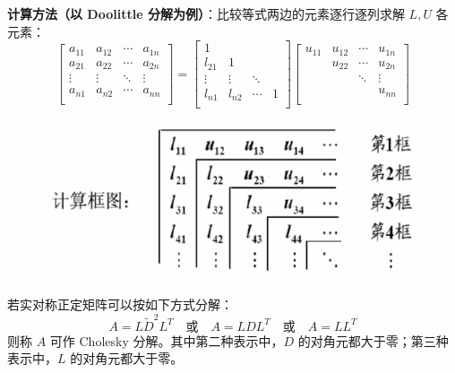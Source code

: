 \noindent\textbf{计算方法（以 Doolittle 分解为例）}：比较等式两边的元素逐行逐列求解 $L,U$ 各元素：
\[
    \begin{bmatrix}
    a_{11}&a_{12}&\cdots&a_{1n}\\
    a_{21}&a_{22}&\cdots&a_{2n}\\
    \vdots&\vdots&\ddots&\vdots\\
    a_{n1}&a_{n2}&\cdots&a_{nn}\\
    \end{bmatrix}=
    \begin{bmatrix}
    1&&&\\
    l_{21}&1&&\\
    \vdots&\vdots&\ddots&\\
    l_{n1}&l_{n2}&\cdots&1\\
    \end{bmatrix}
    \begin{bmatrix}
    u_{11}&u_{12}&\cdots&u_{1n}\\
    &u_{22}&\cdots&u_{2n}\\
    &&\ddots&\vdots\\
    &&&u_{nn}\\
    \end{bmatrix}
\]
\begin{figure}[H]
    \centering
    \includegraphics[width=0.5\linewidth]{figs/calc.png}
\end{figure}

\begin{definition}[Cholesky 分解]
若实对称正定矩阵可以按如下方式分解：
\[
    A=L\tilde D^2L^T\quad\text{或}\quad A=LDL^T\quad\text{或}\quad A=LL^T
\]
则称 $A$ 可作 Cholesky 分解。其中第二种表示中，$D$ 的对角元都大于零；第三种表示中，$L$ 的对角元都大于零。
\end{definition}


